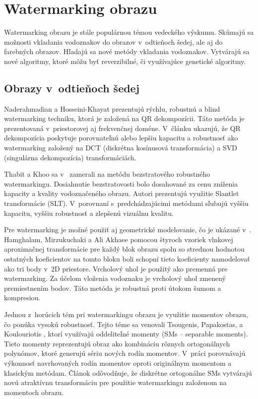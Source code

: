 \section{Watermarking obrazu}
Watermarking obrazu je stále populárnou témou vedeckého výskumu. Skúmajú sa možnosti vkladania vodoznakov do obrazov v~odtieňoch šedej, ale aj do farebných obrazov. Hľadajú sa nové metódy vkladania vodoznakov. Vytvárajú sa nové algoritmy, ktoré môžu byť reverzibilné, či využívajúce genetické algoritmy.

\subsection{Obrazy v~odtieňoch šedej}
Naderahmadian a Hosseini-Khayat \cite{QRdecomposition} prezentujú rýchlu, robustnú a blind watermarking techniku, ktorá je založená na QR dekompozícii. Táto metóda je prezentovaná v~priestorovej aj frekvenčnej doméne. V~článku ukazujú, že QR dekompozícia poskytuje porovnateľnú alebo lepšiu kapacitu a robustnosť ako watermarking založený na DCT (diskrétna kosínusová transformácia) a SVD (singulárna dekompozícia) transformáciách.

Thabit a Khoo sa v~\cite{Thabit2014-11-01} zamerali na metódu bezstratového robustného watermarkingu. Dosiahnutie bezstratovosti bolo dosahované za cenu zníženia kapacity a kvality vodoznačeného obrazu. Autori prezentujú využitie Slantlet transformácie (SLT). V~porovnaní s~predchádzajúcimi metódami sľubujú vyššiu kapacitu, vyššiu robustnosť a zlepšenú vizuálnu kvalitu.

Pre watermarking je možné použiť aj geometrické modelovanie, čo je ukázané v~\cite{Hamghalam2015}. Hamghalam, Mirzukuchaki a Ali Akhaee pomocou štyroch vzoriek vlnkovej aproximačnej transformácie pre každý blok obrazu spolu so strednou hodnotou ostatných koeficientov na tomto bloku boli schopní tieto koeficienty namodelovať ako tri body v~2D priestore. Vrcholový uhol je použitý ako premenná pre watermarking. Za účelom vloženia vodoznaku je vrcholový uhol zmenený premiestnením bodov. Táto metóda je robustná proti útokom šumom a kompresiou.

Jednou z~horúcich tém pri watermarkingu obrazu je využitie momentov obrazu, čo ponúka vysokú robustnosť. Tejto téme sa venovali Tsougenis, Papakostas, a Koulouriotis \cite{Tsougenis2015}, ktorí využívajú oddeliteľné momenty (SMs – separable moments). Tieto momenty reprezentujú obraz ako kombináciu rôznych ortogonálnych polynómov, ktoré generujú sériu nových rodín momentov. V~práci porovnávajú výkonnosť navrhovaných rodín momentov oproti originálnym momentom a klasickým metódam. Článok odôvodňuje, že diskrétne ortogonálne SMs vytvárajú novú atraktívnu transformáciu pre použitie watermarkingu založenom na momentoch obrazu.

